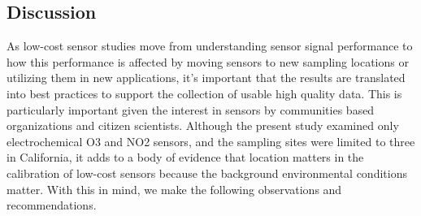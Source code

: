 \documentclass[journal abbreviation, manuscript]{copernicus}
\begin{document}

\subsection{Discussion}

As low-cost sensor studies move from understanding sensor signal performance to how this performance is affected by moving sensors to new sampling locations or utilizing them in new applications, it’s important that the results are translated into best practices to support the collection of usable high quality data. This is particularly important given the interest in sensors by communities based organizations and citizen scientists. Although the present study examined only electrochemical O3 and NO2 sensors, and the sampling sites were limited to three in California, it adds to a body of evidence that location matters in the calibration of low-cost sensors because the background environmental conditions matter.  With this in mind, we make the following observations and recommendations.
\end{document}
